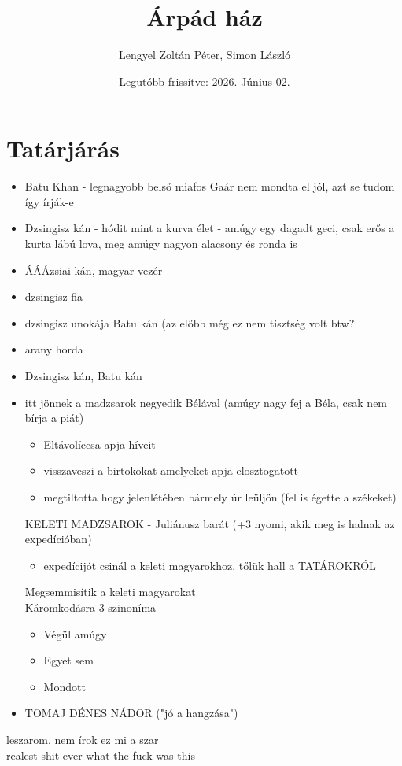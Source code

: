 \documentclass{article}
\title{Árpád ház}
\author{Lengyel Zoltán Péter, Simon László}
\date{Legutóbb frissítve: 2026. Június 02.}
\begin{document}
\maketitle
\tableofcontents


\section{Tatárjárás}
\begin{itemize}
    \item Batu Khan - legnagyobb belső miafos Gaár nem mondta el jól, azt se tudom így írják-e %
    \item Dzsingisz kán - hódit mint a kurva élet - amúgy egy dagadt geci, csak erős a kurta lábú lova, meg amúgy nagyon alacsony és ronda is
    \item ÁÁÁzsiai kán, magyar vezér 
    \item dzsingisz fia
    \item dzsingisz unokája Batu kán (az előbb még ez nem tisztség volt btw?%
    \item arany horda
    \item Dzsingisz kán, Batu kán%
    \item itt jönnek a madzsarok negyedik Bélával (amúgy nagy fej a Béla, csak nem bírja a piát) \begin{itemize}
        \item Eltávolíccsa apja híveit
        \item visszaveszi a birtokokat amelyeket apja elosztogatott %
        \item megtiltotta hogy jelenlétében bármely úr leüljön (fel is égette a székeket)
    \end{itemize}
KELETI MADZSAROK - Juliánusz barát (+3 nyomi, akik meg is halnak az expedícióban)
\begin{itemize}
    \item expedícijót csinál a keleti magyarokhoz, tőlük hall a TATÁROKRÓL
\end{itemize}
Megsemmisítik a keleti magyarokat \\
Káromkodásra 3 szinoníma \begin{itemize}
    \item Végül amúgy
    \item Egyet sem
    \item Mondott
\end{itemize}

\item TOMAJ DÉNES NÁDOR ("jó a hangzása")

\end{itemize}

leszarom, nem írok ez mi a szar \\
realest shit ever what the fuck was this
\end{document}
